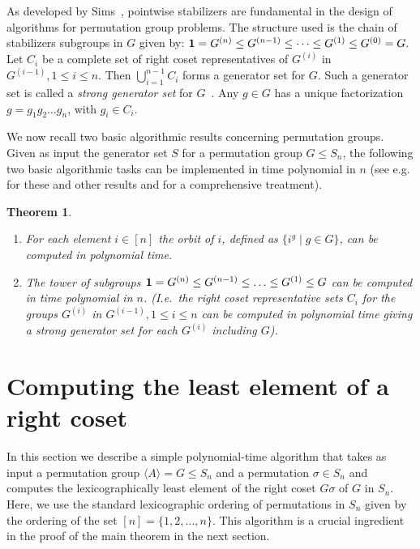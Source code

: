\documentclass{article}
\newtheorem{theorem}{Theorem}[section]
\renewcommand{\angle}[1]{\langle #1\rangle}
\begin{document}
As developed by Sims~\cite{sims70computational}, pointwise stabilizers
are fundamental in the design of algorithms for permutation group
problems. The structure used is the chain of stabilizers subgroups in
$G$ given by: ${\bf 1}=G^{(n)}\leq G^{(n-1)}\leq \dots \leq
G^{(1)}\leq G^{(0)}=G.$ Let $C_i$ be a complete set of right coset
representatives of $G^{(i)}$ in $G^{(i-1)}, 1\leq i\leq n$. Then
$\bigcup_{i=1}^{n-1} C_i$ forms a generator set for $G$. Such a
generator set is called a {\it strong generator set} for
$G$~\cite{sims70computational,furst80polynomialtime}. Any $g\in G$
has a unique factorization $g=g_1g_2\dots g_n$, with $g_i\in C_i$.

We now recall two basic algorithmic results concerning permutation
groups. Given as input the generator set $S$ for a permutation group
$G\leq S_n$, the following two basic algorithmic tasks can be
implemented in time polynomial in $n$ (see e.g.
\cite{sims70computational,furst80polynomialtime} for these and other results 
and \cite{luks93permutation,hoffmann82group} for a comprehensive treatment).
  
\begin{theorem}\label{perm-group-algos}\mbox{}
\begin{enumerate}{}
\item For each element $i\in[n]$ the orbit of $i$, defined as
  $\{i^g\mid g\in G\}$, can be computed in polynomial time.
\item The tower of subgroups ${\bf 1}=G^{(n)}\leq G^{(n-1)} \leq
  \ldots \leq G^{(1)}\leq G$ can be computed in time polynomial in
  $n$. (I.e.\ the right coset representative sets $C_i$ for the groups
  $G^{(i)}$ in $G^{(i-1)}, 1\leq i\leq n$ can be computed in
  polynomial time giving a strong generator set for each $G^{(i)}$
  including $G$).
\end{enumerate}
\end{theorem}

\section{Computing the least element of a right coset}
      
In this section we describe a simple polynomial-time algorithm that
takes as input a permutation group $\angle{A}=G \leq S_n$ and a
permutation $\sigma\in S_n$ and computes the lexicographically least
element of the right coset $G \sigma$ of $G$ in $S_n$. Here, we use
the standard lexicographic ordering of permutations in $S_n$ given by
the ordering of the set $[n]=\{1,2,\ldots,n\}$. This algorithm is a
crucial ingredient in the proof of the main theorem in the next
section. 
\end{document}
